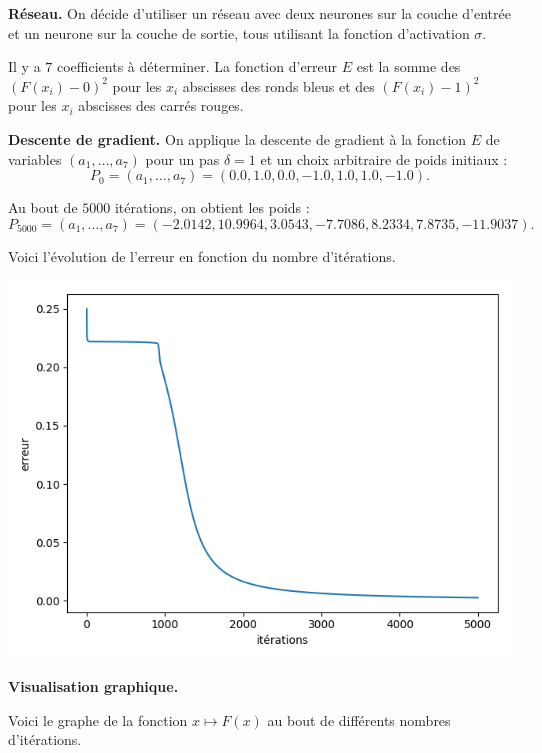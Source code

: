 {\textbf{Réseau.}
On décide d'utiliser un réseau avec deux neurones sur la couche d'entrée et un neurone sur la couche de sortie, tous utilisant la fonction d'activation $\sigma$.


Il y a $7$ coefficients à déterminer.
La fonction d'erreur $E$ est la somme des $(F(x_i)-0)^2$ pour les $x_i$ abscisses des ronds bleus et des $(F(x_i)-1)^2$ pour les $x_i$ abscisses des carrés rouges.

\bigskip

\textbf{Descente de gradient.}
On applique la descente de gradient à la fonction $E$ de variables $(a_1,\ldots,a_7)$ pour un pas $\delta = 1$ et un choix arbitraire de poids initiaux :
$$P_0 = (a_1,\ldots,a_7) = (0.0, 1.0, 0.0, -1.0, 1.0, 1.0, -1.0).$$

Au bout de $5000$ itérations, on obtient les poids :
$$P_{5000} = (a_1,\ldots,a_7) = (-2.0142, 10.9964, 3.0543, -7.7086, 8.2334, 7.8735, -11.9037).$$


Voici l'évolution de l'erreur en fonction du nombre d'itérations.
\begin{center}
	\includegraphics[scale=\myscale,scale=0.5]{figures/retro_03_f}
\end{center}


\bigskip

\textbf{Visualisation graphique.}

Voici le graphe de la fonction $x \mapsto F(x)$ au bout de différents nombres d'itérations.

}
